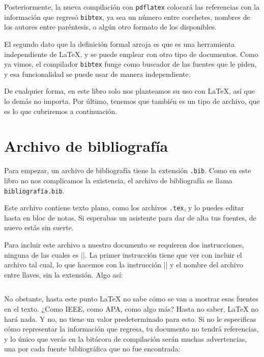 Posteriormente, la nueva compilación con \texttt{pdflatex} colocará las referencias con la información que regresó \texttt{bibtex}, ya sea un número entre corchetes, nombres de los autores entre paréntesis, o algún otro formato de los disponibles.

El segundo dato que la definición formal arroja es que \BibTeX{} es una herramienta independiente de \LaTeX{}, y se puede emplear con otro tipo de documentos. Como ya vimos, el compilador \texttt{bibtex} funge como buscador de las fuentes que le piden, y esa funcionalidad se puede usar de manera independiente.

De cualquier forma, en este libro solo nos planteamos su uso con \LaTeX{}, así que lo demás no importa. Por último, tenemos que \BibTeX{} también es un tipo de archivo, que es lo que cubriremos a continuación.


\section{Archivo de bibliografía}
\label{sec:archivo_de_bibliografia}



Para empezar, un archivo de bibliografía tiene la extensión \texttt{.bib}. Como en este libro no nos complicamos la existencia, el archivo de bibliografía se llama \texttt{bibliografía.bib}.

Este archivo contiene texto plano, como los archivos \texttt{.tex}, y lo puedes editar hasta en bloc de notas. Si esperabas un asistente para dar de alta tus fuentes, de nuevo estás sin suerte.

Para incluir este archivo a nuestro documento se requieren dos instrucciones, ninguna de las cuales es ||. La primer instrucción tiene que ver con incluir el archivo tal cual, lo que hacemos con la instrucción || y el nombre del archivo entre llaves, sin la extensión. Algo así:

\begin{lstlisting}[style=latex]

\end{lstlisting}

No obstante, hasta este punto \LaTeX{} no sabe cómo se van a mostrar esas fuentes en el texto. ¿Como IEEE, como APA, como algo más? Hasta no saber, \LaTeX{} no hará nada. Y no, no tiene un valor predeterminado para esto. Si no le especificas cómo representar la información que \BibTeX{} regresa, tu documento no tendrá referencias, y lo único que verás en la bitácora de compilación serán muchas advertencias, una por cada fuente bibliográfica que no fue encontrada:

